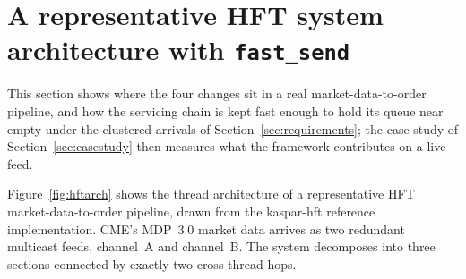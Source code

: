 \documentclass[11pt]{article}
\newcommand{\fs}{\texttt{fast\_send}}
\begin{document}
\section{A representative HFT system architecture with \fs{}}
\label{sec:hftarch}

This section shows where the four changes sit in a real market-data-to-order
pipeline, and how the servicing chain is kept fast enough to hold its queue near
empty under the clustered arrivals of Section~\ref{sec:requirements}; the case
study of Section~\ref{sec:casestudy} then measures what the framework contributes
on a live feed.

Figure~\ref{fig:hftarch} shows the thread architecture of a representative HFT
market-data-to-order pipeline, drawn from the kaspar-hft reference
implementation. CME's MDP~3.0 market data arrives as two redundant multicast
feeds, channel~A and channel~B. The system decomposes into three sections
connected by exactly two cross-thread hops.
\end{document}
